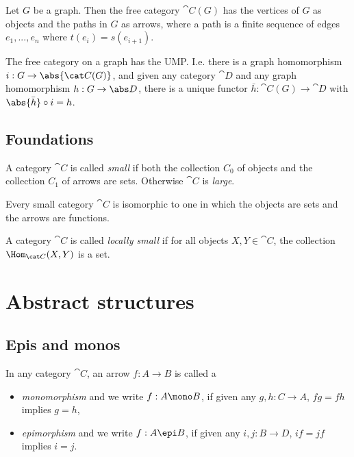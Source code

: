\documentclass{article}
\begin{document}
\begin{definition}
	Let $G$ be a graph. Then the free category $\cat C(G)$ has the vertices
	of $G$ as objects and the paths in $G$ as arrows, where a path is a finite
	sequence of edges $e_1,...,e_n$ where $t(e_i)=s(e_{i+1})$.
\end{definition}

\begin{definition}
	The free category on a graph has the UMP. I.e. there is a graph
	homomorphism $i:G\to\abs{\cat C(G)}$, and given any category $\cat D$
	and any graph homomorphism $h:G\to\abs D$, there is a unique functor
	$\bar h:\cat C(G)\to \cat D$ with $\abs{\bar h}\circ i = h$.
\end{definition}

\subsection{Foundations}

\begin{definition}[Awodey 1.11]
	A category $\cat C$ is called \emph{small} if both the collection $C_0$
	of objects and the collection $C_1$ of arrows are sets. Otherwise $\cat C$
	is \emph{large}.
\end{definition}

\begin{theorem}[Awodey 1.6]
	Every small category $\cat{C}$ is isomorphic
	to one in which the objects are sets and the arrows are functions.
\end{theorem}

\begin{definition}[Awodey 1.12]
	A category $\cat C$ is called \emph{locally small} if for all objects
	$X,Y\in\cat C$, the collection $\Hom_{\cat C}(X,Y)$ is a set.
\end{definition}

\section{Abstract structures}


\subsection{Epis and monos}

\begin{definition}[Awodey 2.1]
	In any category $\cat C$, an arrow $f:A\to B$ is called a
	\begin{itemize}
		\item \emph{monomorphism} and we write $f:A\mono B$, if given any $g,h:C\to A$, $fg=fh$ implies $g=h$,
		\item \emph{epimorphism} and we write $f:A\epi B$, if given any $i,j:B\to D$, $if=jf$ implies $i=j$.
	\end{itemize}
\end{definition}
\end{document}
